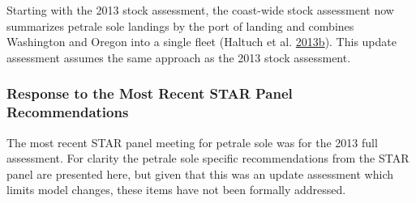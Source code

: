 \documentclass[12pt,]{article}
\begin{document}
Starting with the 2013 stock assessment, the coast-wide stock assessment
now summarizes petrale sole landings by the port of landing and combines
Washington and Oregon into a single fleet (Haltuch et al.
\protect\hyperlink{ref-haltuch_status_2013}{2013}\protect\hyperlink{ref-haltuch_status_2013}{b}).
This update assessment assumes the same approach as the 2013 stock
assessment.

\subsubsection{Response to the Most Recent STAR Panel
Recommendations}\label{response-to-the-most-recent-star-panel-recommendations}

The most recent STAR panel meeting for petrale sole was for the 2013
full assessment. For clarity the petrale sole specific recommendations
from the STAR panel are presented here, but given that this was an
update assessment which limits model changes, these items have not been
formally addressed.
\end{document}
